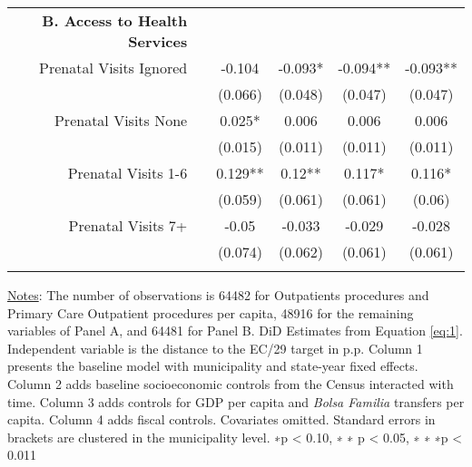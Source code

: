 \begin{table}[h!]
\begin{footnotesize}
\begin{center}
{\begin{threeparttable}[b]
\begin{tabular}{rrrrrr}
          &       &       &       &       &  \\
    \midrule
    \multicolumn{1}{p{26.355em}}{\textbf{B. Access to Health Services}} &       &       &       &       &  \\
    \multicolumn{1}{p{26.355em}}{Prenatal Visits Ignored} &       & \multicolumn{1}{c}{-0.104} & \multicolumn{1}{c}{-0.093*} & \multicolumn{1}{c}{-0.094**} & \multicolumn{1}{c}{-0.093**} \\
          &       & \multicolumn{1}{c}{(0.066)} & \multicolumn{1}{c}{(0.048)} & \multicolumn{1}{c}{(0.047)} & \multicolumn{1}{c}{(0.047)} \\
    \multicolumn{1}{p{26.355em}}{Prenatal Visits None} &       & \multicolumn{1}{c}{0.025*} & \multicolumn{1}{c}{0.006} & \multicolumn{1}{c}{0.006} & \multicolumn{1}{c}{0.006} \\
          &       & \multicolumn{1}{c}{(0.015)} & \multicolumn{1}{c}{(0.011)} & \multicolumn{1}{c}{(0.011)} & \multicolumn{1}{c}{(0.011)} \\
    \multicolumn{1}{p{26.355em}}{Prenatal Visits 1-6} &       & \multicolumn{1}{c}{0.129**} & \multicolumn{1}{c}{0.12**} & \multicolumn{1}{c}{0.117*} & \multicolumn{1}{c}{0.116*} \\
          &       & \multicolumn{1}{c}{(0.059)} & \multicolumn{1}{c}{(0.061)} & \multicolumn{1}{c}{(0.061)} & \multicolumn{1}{c}{(0.06)} \\
    \multicolumn{1}{p{26.355em}}{Prenatal Visits 7+} &       & \multicolumn{1}{c}{-0.05} & \multicolumn{1}{c}{-0.033} & \multicolumn{1}{c}{-0.029} & \multicolumn{1}{c}{-0.028} \\
          &       & \multicolumn{1}{c}{(0.074)} & \multicolumn{1}{c}{(0.062)} & \multicolumn{1}{c}{(0.061)} & \multicolumn{1}{c}{(0.061)} \\
          &       &       &       &       &  \\
    \bottomrule
    \bottomrule
    \end{tabular}%
    
    \begin{tablenotes}
  \scriptsize{\underline{Notes}: The number of observations is 64482 for Outpatients procedures and Primary Care Outpatient procedures per capita,  48916 for the remaining variables of Panel A, and  64481 for Panel B. DiD Estimates from Equation \ref{eq:1}. Independent variable is the distance to the EC/29 target in p.p. Column 1 presents the baseline model with municipality and state-year fixed effects. Column 2 adds baseline socioeconomic controls from the Census interacted with time. Column 3 adds controls for GDP per capita and \emph{Bolsa Familia} transfers per capita. Column 4 adds fiscal controls. Covariates omitted. Standard errors in brackets are clustered in the municipality level. ∗p < 0.10, ∗ ∗ p < 0.05, ∗ ∗ ∗p < 0.011}
  \end{tablenotes}
    

\end{threeparttable}}
\end{center}
\end{footnotesize}
\end{table}
